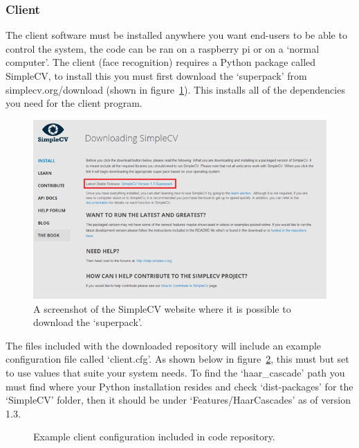 \documentclass[a4paper]{article}
\begin{document}
    \subsubsection{Client}
        The client software must be installed anywhere you want end-users to be able to control the system, the code can be ran on a 
        raspberry pi or on a `normal computer'. 
        The client (face recognition) requires a Python package called SimpleCV, to install this you must first 
        download the `superpack' from simplecv.org/download (shown in figure~\ref{fig:simplecv}).  This installs all of the dependencies 
        you need for the client program.

        \begin{figure}[H]
            \centering
            \caption{A screenshot of the SimpleCV website where it is possible to download the `superpack'.}
            \label{fig:simplecv}
                \includegraphics[scale=0.7]{../shared_assets/screenshots/manual/simplecv_download.png}
        \end{figure}

        The files included with the downloaded repository will include an example configuration file called `client.cfg'. As shown
        below in figure~\ref{lst:clientcfg}, this must but set to use values that suite your system needs. To find the `haar\_cascade'
        path you must find where your Python installation resides and check `dist-packages' for the `SimpleCV' folder, then it should
        be under `Features/HaarCascades' as of version 1.3.

        \begin{figure}[H]
            \centering
            \caption{Example client configuration included in code repository.}
            \label{lst:clientcfg}
                
        \end{figure}
\end{document}
